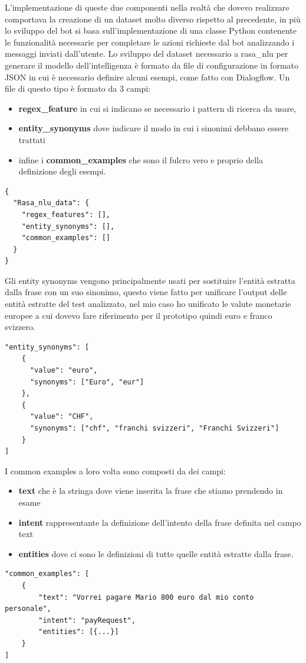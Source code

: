L'implementazione di queste due componenti nella realtà che dovevo realizzare comportava la creazione di un dataset molto diverso rispetto al precedente, in più lo sviluppo del bot si basa sull'implementazione di una classe Python contenente le funzionalità necessarie per completare le azioni richieste dal bot analizzando i messaggi inviati dall'utente.
Lo sviluppo del dataset necessario a rasa\_nlu per generare il modello dell'intelligenza è formato da file di configurazione in formato JSON in cui è necessario definire alcuni esempi, come fatto con Dialogflow. Un file di questo tipo è formato da 3 campi:
\begin{itemize}
\item \textbf{regex\_feature} in cui si indicano se necessario i pattern di ricerca da usare,
\item \textbf{entity\_synonyms} dove indicare il modo in cui i sinonimi debbano essere trattati
\item infine i \textbf{common\_examples} che sono il fulcro vero e proprio della definizione degli esempi.
\end{itemize}
\begin{lstlisting}
{
  "Rasa_nlu_data": {
    "regex_features": [],
    "entity_synonyms": [],
    "common_examples": []
  }
}
\end{lstlisting}
Gli entity synonyms vengono principalmente usati per sostituire l'entità estratta dalla frase con un suo sinonimo, questo viene fatto per unificare l'output delle entità estratte del test analizzato, nel mio caso ho unificato le valute monetarie europee a cui dovevo fare riferimento per il prototipo quindi euro e franco svizzero.
\begin{lstlisting}
"entity_synonyms": [
    {
      "value": "euro",
      "synonyms": ["Euro", "eur"]
    },
    {
      "value": "CHF",
      "synonyms": ["chf", "franchi svizzeri", "Franchi Svizzeri"]
    }
]
\end{lstlisting}
I common examples a loro volta sono composti da dei campi:
\begin{itemize}
\item \textbf{text} che è la stringa dove viene inserita la frase che stiamo prendendo in esame
\item \textbf{intent} rappresentante la definizione dell'intento della frase definita nel campo text
\item \textbf{entities} dove ci sono le definizioni di tutte quelle entità estratte dalla frase.
\end{itemize}
\begin{lstlisting}
"common_examples": [
    {
        "text": "Vorrei pagare Mario 800 euro dal mio conto personale",
        "intent": "payRequest",
        "entities": [{...}]
    }
]
\end{lstlisting}
